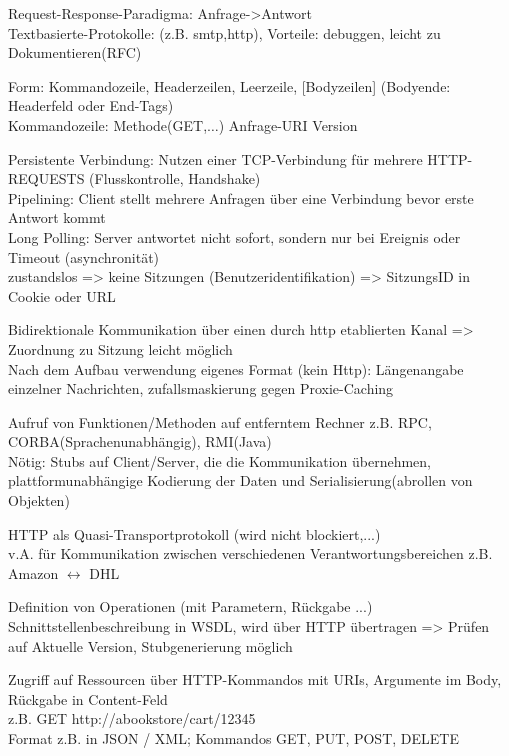 Request-Response-Paradigma: Anfrage->Antwort\\
Textbasierte-Protokolle: (z.B. smtp,http), Vorteile: debuggen, leicht zu Dokumentieren(RFC)

Form: Kommandozeile, Headerzeilen, Leerzeile, [Bodyzeilen] (Bodyende: Headerfeld oder End-Tags)\\
Kommandozeile: Methode(GET,$\dots$) Anfrage-URI Version

Persistente Verbindung: Nutzen einer TCP-Verbindung für mehrere HTTP-REQUESTS (Flusskontrolle, Handshake)\\
Pipelining: Client stellt mehrere Anfragen über eine Verbindung bevor erste Antwort kommt\\
Long Polling: Server antwortet nicht sofort, sondern nur bei Ereignis oder Timeout (asynchronität)\\
zustandslos => keine Sitzungen (Benutzeridentifikation) => SitzungsID in Cookie oder URL

Bidirektionale Kommunikation über einen durch http etablierten Kanal => Zuordnung zu Sitzung leicht möglich\\
Nach dem Aufbau verwendung eigenes Format (kein Http): Längenangabe einzelner Nachrichten, zufallsmaskierung gegen Proxie-Caching

Aufruf von Funktionen/Methoden auf entferntem Rechner z.B. RPC, CORBA(Sprachenunabhängig), RMI(Java)\\
Nötig: Stubs auf Client/Server, die die Kommunikation übernehmen, plattformunabhängige Kodierung der Daten und Serialisierung(abrollen von Objekten) 

HTTP als Quasi-Transportprotokoll (wird nicht blockiert,...) \\
v.A. für Kommunikation zwischen verschiedenen Verantwortungsbereichen z.B. Amazon $\longleftrightarrow$ DHL

Definition von Operationen (mit Parametern, Rückgabe ...)\\
Schnittstellenbeschreibung in WSDL, wird über HTTP übertragen => Prüfen auf Aktuelle Version, Stubgenerierung möglich

Zugriff auf Ressourcen über HTTP-Kommandos mit URIs, Argumente im Body, Rückgabe in Content-Feld\\
z.B. GET http://abookstore/cart/12345\\
Format z.B. in JSON / XML; Kommandos GET, PUT, POST, DELETE

